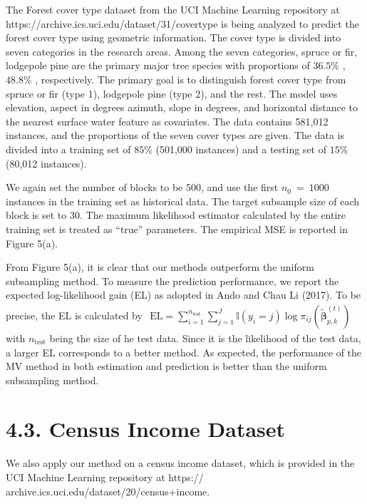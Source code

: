 The Forest cover type dataset from the UCI Machine Learning repository
at https://archive.ics.uci.edu/dataset/31/covertype is being analyzed to
predict the forest cover type using geometric information. The cover
type is divided into seven categories in the research areas. Among the
seven categories, spruce or fir, lodgepole pine are the primary major
tree species with proportions of \(3 6 . 5 \%\) , \(4 8 . 8 \%\) ,
respectively. The primary goal is to distinguish forest cover type from
spruce or fir (type 1), lodgepole pine (type 2), and the rest. The model
uses elevation, aspect in degrees azimuth, slope in degrees, and
horizontal distance to the nearest surface water feature as covariates.
The data contains 581,012 instances, and the proportions of the seven
cover types are given. The data is divided into a training set of
\(8 5 \%\) (501,000 instances) and a testing set of \(1 5 \%\) (80,012
instances).

We again set the number of blocks to be 500, and use the first
\(n _ { 0 } ~ = ~ 1 0 0 0\) instances in the training set as historical
data. The target subsample size of each block is set to 30. The maximum
likelihood estimator calculated by the entire training set is treated as
``true'' parameters. The empirical MSE is reported in Figure 5(a).

From Figure 5(a), it is clear that our methods outperform the uniform
subsampling method. To measure the prediction performance, we report the
expected log-likelihood gain (EL) as adopted in Ando and Chau Li (2017).
To be precise, the EL is calculated by
\(\begin{array} { r } { \mathrm { E L } = \sum _ { i = 1 } ^ { n _ { \mathrm { t e s t } } } \sum _ { j = 1 } ^ { J } \mathbb { I } ( y _ { i } = j ) \log \pi _ { i j } ( \tilde { \boldsymbol { \beta } } _ { p , k } ^ { ( t ) } ) } \end{array}\)
with \(n _ { \mathrm { t e s t } }\) being the size of he test data.
Since it is the likelihood of the test data, a larger EL corresponds to
a better method. As expected, the performance of the MV method in both
estimation and prediction is better than the uniform subsampling method.

\section{4.3. Census Income Dataset}\label{census-income-dataset}

We also apply our method on a census income dataset, which is provided
in the UCI Machine Learning repository at https://
archive.ics.uci.edu/dataset/20/census+income.

